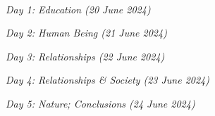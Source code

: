  {\nobreakspace {}\nobreakspace {}\nobreakspace {} }\\ \par 
 {\relax \fontsize {14.4}{18}\selectfont \it \nobreakspace {}\nobreakspace {}\nobreakspace {}\nobreakspace {}\nobreakspace {}\nobreakspace {}\nobreakspace {}\nobreakspace {}\nobreakspace {}\nobreakspace {}Day 1: Education (20 June 2024)}\\ \par 
 {\relax \fontsize {14.4}{18}\selectfont \it \nobreakspace {}\nobreakspace {}\nobreakspace {}\nobreakspace {}\nobreakspace {}\nobreakspace {}\nobreakspace {}\nobreakspace {}\nobreakspace {}\nobreakspace {}Day 2: Human Being (21 June 2024)}\\ \par 
 {\relax \fontsize {14.4}{18}\selectfont \it \nobreakspace {}\nobreakspace {}\nobreakspace {}\nobreakspace {}\nobreakspace {}\nobreakspace {}\nobreakspace {}\nobreakspace {}\nobreakspace {}\nobreakspace {}Day 3: Relationships (22 June 2024)}\\ \par 
 {\relax \fontsize {14.4}{18}\selectfont \it \nobreakspace {}\nobreakspace {}\nobreakspace {}\nobreakspace {}\nobreakspace {}\nobreakspace {}\nobreakspace {}\nobreakspace {}\nobreakspace {}\nobreakspace {}Day 4: Relationships \& Society (23 June 2024)}\\ \par 
 {\relax \fontsize {14.4}{18}\selectfont \it \nobreakspace {}\nobreakspace {}\nobreakspace {}\nobreakspace {}\nobreakspace {}\nobreakspace {}\nobreakspace {}\nobreakspace {}\nobreakspace {}\nobreakspace {}Day 5: Nature; Conclusions (24 June 2024)}\\ \par 
